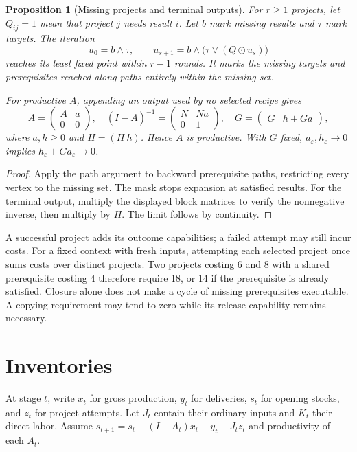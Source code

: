 \documentclass[11pt,a4paper]{article}
\newtheorem{proposition}[theorem]{Proposition}
\begin{document}
\begin{proposition}[Missing projects and terminal outputs]
For $r\geq1$ projects, let $Q_{ij}=1$ mean that project $j$ needs result $i$. Let $b$ mark missing results and $\tau$ mark targets. The iteration
\begin{equation}
u_0=b\wedge\tau,\qquad u_{s+1}=b\wedge\bigl(\tau\vee(Q\odot u_s)\bigr)
\end{equation}
reaches its least fixed point within $r-1$ rounds. It marks the missing targets and prerequisites reached along paths entirely within the missing set.

For productive $A$, appending an output used by no selected recipe gives
\begin{equation}
\overline A=\begin{pmatrix}A&a\\0&0\end{pmatrix},\quad
(I-\overline A)^{-1}=\begin{pmatrix}N&Na\\0&1\end{pmatrix},\quad
\overline G=\begin{pmatrix}G&h+Ga\end{pmatrix},
\end{equation}
where $a,h\geq0$ and $\overline H=(H\ h)$. Hence $\overline A$ is productive. With $G$ fixed, $a_\varepsilon,h_\varepsilon\to0$ implies $h_\varepsilon+Ga_\varepsilon\to0$.
\end{proposition}
\begin{proof}
Apply the path argument to backward prerequisite paths, restricting every vertex to the missing set. The mask stops expansion at satisfied results. For the terminal output, multiply the displayed block matrices to verify the nonnegative inverse, then multiply by $\overline H$. The limit follows by continuity.
\end{proof}

A successful project adds its outcome capabilities; a failed attempt may still incur costs. For a fixed context with fresh inputs, attempting each selected project once sums costs over distinct projects. Two projects costing 6 and 8 with a shared prerequisite costing 4 therefore require 18, or 14 if the prerequisite is already satisfied. Closure alone does not make a cycle of missing prerequisites executable. A copying requirement may tend to zero while its release capability remains necessary.

\section{Inventories}
At stage $t$, write $x_t$ for gross production, $y_t$ for deliveries, $s_t$ for opening stocks, and $z_t$ for project attempts. Let $J_t$ contain their ordinary inputs and $K_t$ their direct labor. Assume $s_{t+1}=s_t+(I-A_t)x_t-y_t-J_tz_t$ and productivity of each $A_t$.
\end{document}
